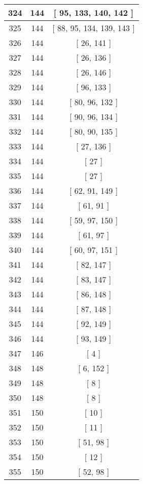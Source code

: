 \begin{center}
\begin{longtable}[H]{|| c c c ||}
\hline
324 & 144 & [ 95, 133, 140, 142 ] \\ 
\hline
325 & 144 & [ 88, 95, 134, 139, 143 ] \\ 
\hline
326 & 144 & [ 26, 141 ] \\ 
\hline
327 & 144 & [ 26, 136 ] \\ 
\hline
328 & 144 & [ 26, 146 ] \\ 
\hline
329 & 144 & [ 96, 133 ] \\ 
\hline
330 & 144 & [ 80, 96, 132 ] \\ 
\hline
331 & 144 & [ 90, 96, 134 ] \\ 
\hline
332 & 144 & [ 80, 90, 135 ] \\ 
\hline
333 & 144 & [ 27, 136 ] \\ 
\hline
334 & 144 & [ 27 ] \\ 
\hline
335 & 144 & [ 27 ] \\ 
\hline
336 & 144 & [ 62, 91, 149 ] \\ 
\hline
337 & 144 & [ 61, 91 ] \\ 
\hline
338 & 144 & [ 59, 97, 150 ] \\ 
\hline
339 & 144 & [ 61, 97 ] \\ 
\hline
340 & 144 & [ 60, 97, 151 ] \\ 
\hline
341 & 144 & [ 82, 147 ] \\ 
\hline
342 & 144 & [ 83, 147 ] \\ 
\hline
343 & 144 & [ 86, 148 ] \\ 
\hline
344 & 144 & [ 87, 148 ] \\ 
\hline
345 & 144 & [ 92, 149 ] \\ 
\hline
346 & 144 & [ 93, 149 ] \\ 
\hline
347 & 146 & [ 4 ] \\ 
\hline
348 & 148 & [ 6, 152 ] \\ 
\hline
349 & 148 & [ 8 ] \\ 
\hline
350 & 148 & [ 8 ] \\ 
\hline
351 & 150 & [ 10 ] \\ 
\hline
352 & 150 & [ 11 ] \\ 
\hline
353 & 150 & [ 51, 98 ] \\ 
\hline
354 & 150 & [ 12 ] \\ 
\hline
355 & 150 & [ 52, 98 ] \\ 
\hline
\end{longtable}
\end{center}
